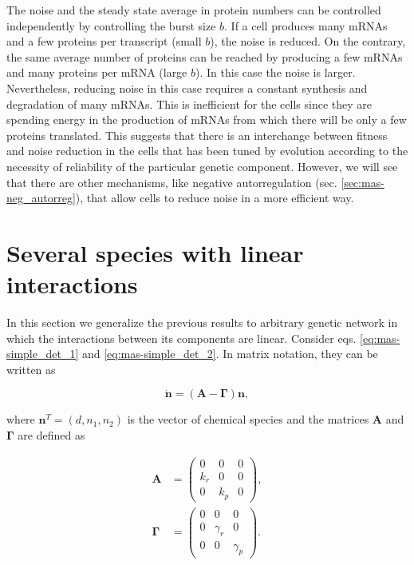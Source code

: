 

The noise and the steady state average in protein numbers can be controlled independently by controlling the burst size $b$. If a cell produces many mRNAs and a few proteins per transcript (small $b$), the noise is reduced. On the contrary, the same average number of proteins can be reached by producing a few mRNAs and many proteins per mRNA (large $b$). In this case the noise is larger. Nevertheless, reducing noise in this case requires a constant synthesis and degradation of many mRNAs. This is inefficient for the cells since they are spending energy in the production of mRNAs from which there will be only a few proteins translated. This suggests that there is an interchange between fitness and noise reduction in the cells that has been tuned by evolution according to the necessity of reliability of the particular genetic component. However, we will see that there are other mechanisms, like negative autorregulation (sec. \ref{sec:mas-neg_autorreg}), that allow cells to reduce noise in a more efficient way.


\section{Several species with linear interactions}

In this section we generalize the previous results to arbitrary genetic network in which the interactions between its components are linear. Consider eqs. \eqref{eq:mas-simple_det_1} and \eqref{eq:mas-simple_det_2}. In matrix notation, they can be written as

\begin{equation}
  \label{eq:matdet}
  \mathbf{\dot{n}} = \left( \mathbf{A} - \mathbf{\Gamma} \right) \mathbf{n},
\end{equation}

where $\mathbf{n}^T=(d,n_1,n_2)$ is the vector of chemical species and the matrices $\mathbf{A}$ and $\mathbf{\Gamma}$ are defined as


\begin{align}
  \mathbf{A} &=
  \begin{pmatrix}
    0 & 0 & 0 \\
    k_r & 0 & 0 \\
    0 & k_p & 0
  \end{pmatrix} \label{eq:mas_A_single},\\
  \mathbf{\Gamma} &=
  \begin{pmatrix}
    0 & 0 & 0 \\
    0 & \gamma_r & 0 \\
    0 & 0 & \gamma_p 
  \end{pmatrix} \label{eq:mas_G_single}. 
\end{align}

